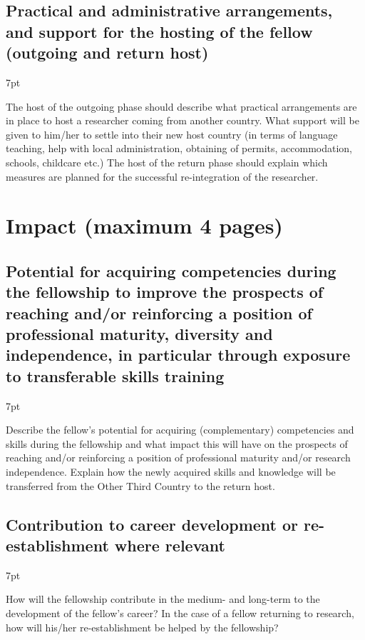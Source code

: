 \documentclass[11pt]{ltxdoc}
\newenvironment{formal}{%
  \def\FrameCommand{%
    \hspace{1pt}%
    {\color{darkblue}\vrule width 2pt}%
    {\color{formalshade}\vrule width 4pt}%
    \colorbox{formalshade}%
  }%
  \MakeFramed{\advance\hsize-\width\FrameRestore}%
  \noindent\hspace{-4.55pt}%
  \begin{adjustwidth}{}{7pt}%
  \vspace{2pt}\vspace{2pt}%
}
{%
  \vspace{2pt}\end{adjustwidth}\endMakeFramed%
}
\begin{document}
\subsection{Practical and administrative arrangements, and support for
  the hosting of the fellow (outgoing and return host)}

\begin{formal}
  The host of the outgoing phase should describe what practical
  arrangements are in place to host a researcher coming from another
  country. What support will be given to him/her to settle into their
  new host country (in terms of language teaching, help with local
  administration, obtaining of permits, accommodation, schools,
  childcare etc.) The host of the return phase should explain which
  measures are planned for the successful re-integration of the
  researcher.
\end{formal}

\section{Impact (maximum 4 pages)}

\subsection{Potential for acquiring competencies during the fellowship
  to improve the prospects of reaching and/or reinforcing a position
  of professional maturity, diversity and independence, in particular
  through exposure to transferable skills training}

\begin{formal}
  Describe the fellow's potential for acquiring (complementary)
  competencies and skills during the fellowship and what impact this
  will have on the prospects of reaching and/or reinforcing a position
  of professional maturity and/or research independence. Explain how
  the newly acquired skills and knowledge will be transferred from the
  Other Third Country to the return host.
\end{formal}

\subsection{Contribution to career development or re-establishment
  where relevant}

\begin{formal}
  How will the fellowship contribute in the medium- and long-term to
  the development of the fellow’s career? In the case of a fellow
  returning to research, how will his/her re-establishment be helped
  by the fellowship?
\end{formal}
\end{document}
